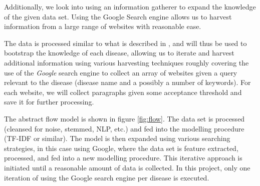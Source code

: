 \documentclass[10pt,letterpaper,two column,final]{article}
\begin{document}
Additionally, we look into using an information gatherer to expand the
knowledge of the given data set. Using the Google Search engine allows
us to harvest information from a large range of websites with reasonable
ease.




The data is processed similar to what is described in
\cite{jensenandersen}, and will thus be used to bootstrap the knowledge
of each disease, allowing us to iterate and harvest additional
information using various harvesting techniques roughly covering the use
of the \textit{Google} search engine to collect an array of websites
given a query relevant to the disease (disease name and a possibly a
number of keywords). For each website, we will collect paragraphs given some acceptance threshold and
save it for further processing.


The abstract flow model is shown in figure \ref{fig:flow}. The data set
is processed (cleansed for noise, stemmed, NLP, etc.) and fed into the modelling
procedure (TF-IDF or similar). The model is then expanded using various
searching strategies, in this case using Google, where the data set is
feature extracted, processed, and fed into a new modelling procedure.
This iterative approach is initiated until a reasonable amount of data
is collected. In this project, only one iteration of using the Google
search engine per disease is executed.
\end{document}

